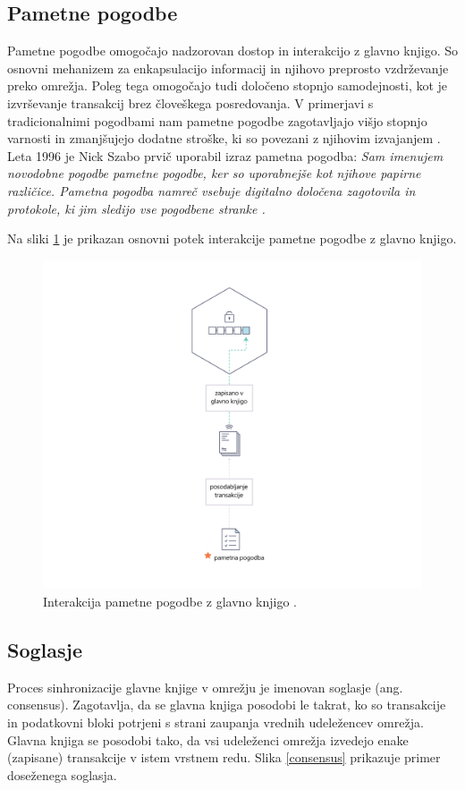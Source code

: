 \documentclass[a4paper, 12pt]{book}
\begin{document}
\subsection{Pametne pogodbe}
Pametne pogodbe omogočajo nadzorovan dostop in interakcijo z glavno knjigo.
So osnovni mehanizem za enkapsulacijo informacij in njihovo preprosto vzdrže\-vanje preko omrežja.
Poleg tega omogočajo tudi določeno stopnjo samodejnosti, kot je izvrševanje transakcij brez človeškega posredovanja.
V primerjavi s tradicionalnimi pogodbami nam pametne pogodbe zagotavljajo višjo stopnjo varnosti in zmanjšujejo dodatne stroške, ki so povezani z njihovim izvajanjem \cite{atzei2017survey}.
Leta 1996 je Nick Szabo prvič uporabil izraz pametna pogodba:
\textit{Sam imenujem novodobne pogodbe pametne pogodbe, ker so uporabnejše kot njihove papirne različice.
Pametna pogodba namreč vsebuje digitalno določena zagotovila in protokole, ki jim sledijo vse pogodbene stranke \cite{szabo1996smart, balanticd}.}

Na sliki \ref{smart_contract} je prikazan osnovni potek interakcije pametne pogodbe z glavno knjigo.

\begin{figure}[h]
	\includegraphics[width=1.0\textwidth]{slike/Smart_Contract_sl.png}
	\caption{Interakcija pametne pogodbe z glavno knjigo \cite{hyperledgerDocs}.}
	\label{smart_contract}
\end{figure}


\subsection{Soglasje}
Proces sinhronizacije glavne knjige v omrežju je imenovan soglasje (ang. consensus).
Zagotavlja, da se glavna knjiga posodobi le takrat, ko so transakcije in podatkovni bloki potrjeni s strani zaupanja vrednih udeležencev omrežja.
Glavna knjiga se posodobi tako, da vsi udeleženci omrežja izvedejo enake (zapisane) transakcije v istem vrstnem redu.
Slika \ref{consensus} prikazuje primer doseženega soglasja.
\end{document}
